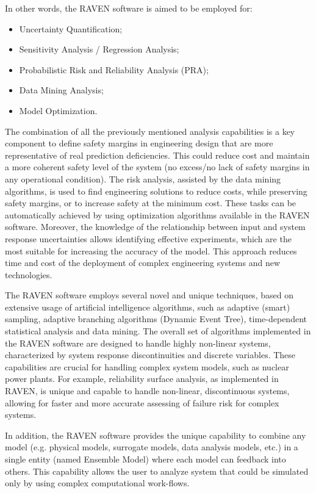 In other words, the RAVEN software is aimed to be employed for:
\begin{itemize}
  \item Uncertainty Quantification;
  \item Sensitivity Analysis / Regression Analysis;
  \item Probabilistic Risk and Reliability Analysis (PRA);
  \item Data Mining Analysis;
  \item Model Optimization.
\end{itemize}

The combination of all the previously mentioned analysis capabilities is a key component to 
define safety margins in engineering design that are more representative of real prediction deficiencies. 
This could reduce 
cost and maintain a more coherent safety level of the system (no excess/no lack of safety margins in any operational 
condition).
The risk analysis, assisted by the data mining algorithms, is used to find engineering solutions to reduce costs, while 
preserving safety margins, or to increase safety at the minimum cost. These tasks can be automatically achieved by using 
optimization algorithms available in the RAVEN software.
Moreover, the knowledge of the relationship between input and system response uncertainties allows identifying effective 
experiments, which are the most suitable for increasing the accuracy of the model. This approach reduces time and cost 
of the deployment of complex engineering systems and new technologies.

The RAVEN software employs several novel and unique techniques, based on extensive usage of artificial intelligence 
algorithms, such as adaptive (smart) sampling, adaptive branching algorithms (Dynamic Event Tree), time-dependent 
statistical analysis and data mining. 
The overall set of algorithms implemented in the RAVEN software are designed to handle highly non-linear systems, 
characterized by system response discontinuities and discrete variables. These capabilities are crucial for handling 
complex system models, such as nuclear power plants.
For example, reliability surface analysis, as implemented in RAVEN, is unique and capable to handle non-linear, 
discontinuous systems, allowing for faster and more accurate assessing of failure risk for complex systems.

In addition, the RAVEN software provides the unique capability to combine any model (e.g. physical models, surrogate 
models, data analysis models, etc.) in a single entity (named Ensemble Model) where each model can feedback into others. This capability allows the user to analyze system that could be simulated only by using complex computational work-flows.

